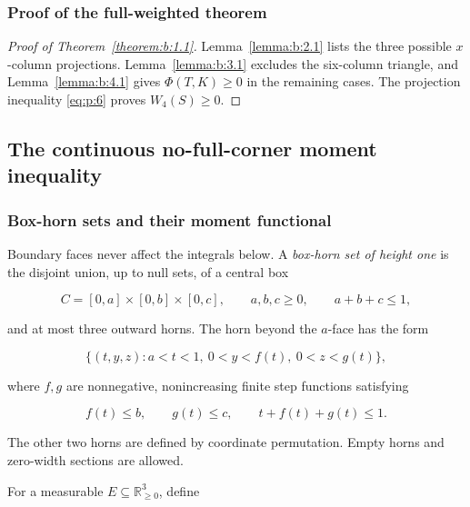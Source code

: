 \subsubsection{Proof of the full-weighted theorem}

\begin{proof}[Proof of Theorem~\ref{theorem:b:1.1}]

Lemma~\ref{lemma:b:2.1} lists the three possible \(x\)-column projections. Lemma~\ref{lemma:b:3.1}
excludes the six-column triangle, and Lemma~\ref{lemma:b:4.1} gives
\(\Phi(T,K)\ge0\) in the remaining cases. The projection inequality
\eqref{eq:p:6} proves \(W_4(S)\ge0\).

\end{proof}


\subsection{The continuous no-full-corner moment inequality}\label{sec:analytic-c}


\subsubsection{Box-horn sets and their moment functional}

Boundary faces never affect the integrals below. A \emph{box-horn set of height
one} is the disjoint union, up to null sets, of a central box

\begin{equation}
C=[0,a]\times[0,b]\times[0,c],
\qquad a,b,c\ge0,\qquad a+b+c\le1,
\label{eq:c:5}
\end{equation}

and at most three outward horns. The horn beyond the \(a\)-face has the form

\begin{equation}
\{(t,y,z):a<t<1,\ 0<y<f(t),\ 0<z<g(t)\},
\label{eq:c:6}
\end{equation}

where \(f,g\) are nonnegative, nonincreasing finite step functions satisfying

\begin{equation}
f(t)\le b,\qquad g(t)\le c,
\qquad t+f(t)+g(t)\le1.
\label{eq:c:7}
\end{equation}

The other two horns are defined by coordinate permutation. Empty horns and
zero-width sections are allowed.

For a measurable \(E\subseteq\mathbb R_{\ge0}^3\), define


